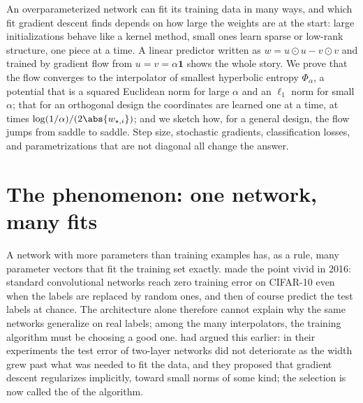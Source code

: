 \newcommand{\diagG}{G}
\newcommand{\diagwl}[1]{w_{\ell_{#1}}}
\newcommand{\diagwphi}{w^\Phi_\alpha}
\newcommand{\diagbar}{\bar w}
\newcommand{\diagH}{\mathrm{H}}

\begin{refsection}

\begin{chaptersummary}
An overparameterized network can fit its training data in many ways, and which fit gradient descent finds depends on how large the weights are at the start: large initializations behave like a kernel method, small ones learn sparse or low-rank structure, one piece at a time. A linear predictor written as $w=u\odot u-v\odot v$ and trained by gradient flow from $u=v=\alpha\mathbf 1$ shows the whole story. We prove that the flow converges to the interpolator of smallest hyperbolic entropy $\Phi_\alpha$, a potential that is a squared Euclidean norm for large $\alpha$ and an $\ell_1$ norm for small $\alpha$; that for an orthogonal design the coordinates are learned one at a time, at times $\log(1/\alpha)/(2\abs{w_{\star,i}})$; and we sketch how, for a general design, the flow jumps from saddle to saddle. Step size, stochastic gradients, classification losses, and parametrizations that are not diagonal all change the answer.
\end{chaptersummary}

\section{The phenomenon: one network, many fits}\label{sec:diagonal:phenomenon}

A network with more parameters than training examples has, as a rule, many parameter vectors that fit the training set exactly. \Textcite{ZhangEtAl2017} made the point vivid in 2016: standard convolutional networks reach zero training error on CIFAR-10 even when the labels are replaced by random ones, and then of course predict the test labels at chance. The architecture alone therefore cannot explain why the same networks generalize on real labels; among the many interpolators, the training algorithm must be choosing a good one. \Textcite{NeyshaburTomiokaSrebro2015} had argued this earlier: in their experiments the test error of two-layer networks did not deteriorate as the width grew past what was needed to fit the data, and they proposed that gradient descent regularizes implicitly, toward small norms of some kind; the selection is now called the  of the algorithm.


\end{refsection}
